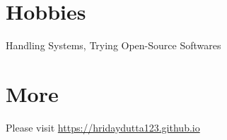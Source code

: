 \documentclass[margin, centered]{res}
\begin{document}
\begin{resume}

\section{Hobbies}
Handling Systems, Trying Open-Source Softwares

\section{More}
Please visit \href{https://hridaydutta123.github.io}{https://hridaydutta123.github.io}

\end{resume}
\end{document}
